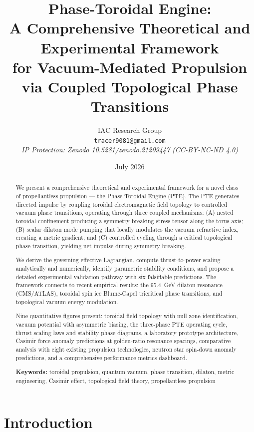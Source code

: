 \documentclass[12pt,a4paper]{article}
\title{\textbf{Phase-Toroidal Engine:\\ A Comprehensive Theoretical and Experimental Framework\\ for Vacuum-Mediated Propulsion via Coupled Topological Phase Transitions}}
\author{IAC Research Group\\[4pt]
\texttt{tracer9081@gmail.com}\\[4pt]
\textit{IP Protection: Zenodo 10.5281/zenodo.21209447 (CC-BY-NC-ND 4.0)}}
\date{July 2026}
\begin{document}
\maketitle
\thispagestyle{empty}

\begin{abstract}
We present a comprehensive theoretical and experimental framework for a novel class of propellantless propulsion --- the Phase-Toroidal Engine (PTE). The PTE generates directed impulse by coupling toroidal electromagnetic field topology to controlled vacuum phase transitions, operating through three coupled mechanisms: (A) nested toroidal confinement producing a symmetry-breaking stress tensor along the torus axis; (B) scalar dilaton mode pumping that locally modulates the vacuum refractive index, creating a metric gradient; and (C) controlled cycling through a critical topological phase transition, yielding net impulse during symmetry breaking.

We derive the governing effective Lagrangian, compute thrust-to-power scaling analytically and numerically, identify parametric stability conditions, and propose a detailed experimental validation pathway with six falsifiable predictions. The framework connects to recent empirical results: the 95.4~GeV dilaton resonance (CMS/ATLAS), toroidal spin ice Blume-Capel tricritical phase transitions, and topological vacuum energy modulation.

Nine quantitative figures present: toroidal field topology with null zone identification, vacuum potential with asymmetric biasing, the three-phase PTE operating cycle, thrust scaling laws and stability phase diagrams, a laboratory prototype architecture, Casimir force anomaly predictions at golden-ratio resonance spacings, comparative analysis with eight existing propulsion technologies, neutron star spin-down anomaly predictions, and a comprehensive performance metrics dashboard.

\textbf{Keywords:} toroidal propulsion, quantum vacuum, phase transition, dilaton, metric engineering, Casimir effect, topological field theory, propellantless propulsion
\end{abstract}

\tableofcontents
\newpage

\section{Introduction}
\label{sec:intro}
\end{document}
